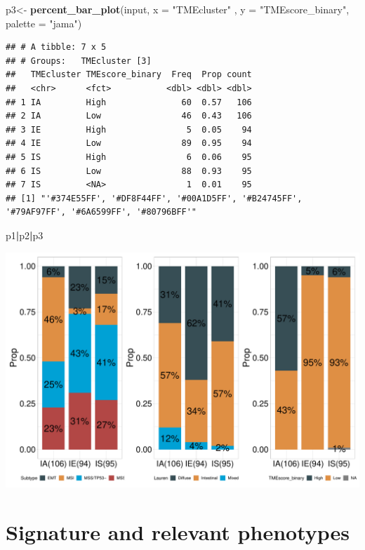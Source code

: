 \documentclass[
  12pt,
]{book}
\newenvironment{Shaded}{\begin{snugshade}}{\end{snugshade}}
\newcommand{\AttributeTok}[1]{\textcolor[rgb]{0.13,0.29,0.53}{#1}}
\newcommand{\FunctionTok}[1]{\textcolor[rgb]{0.13,0.29,0.53}{\textbf{#1}}}
\newcommand{\NormalTok}[1]{#1}
\newcommand{\OtherTok}[1]{\textcolor[rgb]{0.56,0.35,0.01}{#1}}
\newcommand{\SpecialCharTok}[1]{\textcolor[rgb]{0.81,0.36,0.00}{\textbf{#1}}}
\newcommand{\StringTok}[1]{\textcolor[rgb]{0.31,0.60,0.02}{#1}}
\theoremstyle{definition}
\theoremstyle{definition}
\theoremstyle{definition}
\theoremstyle{definition}
\theoremstyle{remark}
\begin{document}
\begin{Shaded}
\begin{Highlighting}[]
\NormalTok{p3}\OtherTok{\textless{}{-}} \FunctionTok{percent\_bar\_plot}\NormalTok{(input, }\AttributeTok{x =} \StringTok{"TMEcluster"}\NormalTok{ , }\AttributeTok{y =} \StringTok{"TMEscore\_binary"}\NormalTok{, }\AttributeTok{palette =} \StringTok{"jama"}\NormalTok{)}
\end{Highlighting}
\end{Shaded}

\begin{verbatim}
## # A tibble: 7 x 5
## # Groups:   TMEcluster [3]
##   TMEcluster TMEscore_binary  Freq  Prop count
##   <chr>      <fct>           <dbl> <dbl> <dbl>
## 1 IA         High               60  0.57   106
## 2 IA         Low                46  0.43   106
## 3 IE         High                5  0.05    94
## 4 IE         Low                89  0.95    94
## 5 IS         High                6  0.06    95
## 6 IS         Low                88  0.93    95
## 7 IS         <NA>                1  0.01    95
## [1] "'#374E55FF', '#DF8F44FF', '#00A1D5FF', '#B24745FF', '#79AF97FF', '#6A6599FF', '#80796BFF'"
\end{verbatim}

\begin{Shaded}
\begin{Highlighting}[]
\NormalTok{p1}\SpecialCharTok{|}\NormalTok{p2}\SpecialCharTok{|}\NormalTok{p3}
\end{Highlighting}
\end{Shaded}

\includegraphics{_main_files/figure-latex/unnamed-chunk-32-1.pdf}

\hypertarget{signature-and-relevant-phenotypes}{%
\chapter{\texorpdfstring{\textbf{Signature and relevant phenotypes}}{Signature and relevant phenotypes}}\label{signature-and-relevant-phenotypes}}
\end{document}
